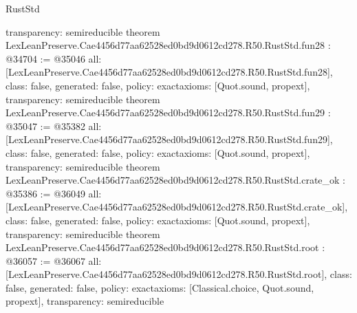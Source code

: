 \begin{lexlean}{RustStd}
\begin{coremodule}
{  transparency: semireducible
}
theorem LexLeanPreserve.Cae4456d77aa62528ed0bd9d0612cd278.R50.RustStd.fun28 : @34704 := @35046 {
  all: [LexLeanPreserve.Cae4456d77aa62528ed0bd9d0612cd278.R50.RustStd.fun28],
  class: false,
  generated: false,
  policy: exact{axioms: [Quot.sound, propext]},
  transparency: semireducible
}
theorem LexLeanPreserve.Cae4456d77aa62528ed0bd9d0612cd278.R50.RustStd.fun29 : @35047 := @35382 {
  all: [LexLeanPreserve.Cae4456d77aa62528ed0bd9d0612cd278.R50.RustStd.fun29],
  class: false,
  generated: false,
  policy: exact{axioms: [Quot.sound, propext]},
  transparency: semireducible
}
theorem LexLeanPreserve.Cae4456d77aa62528ed0bd9d0612cd278.R50.RustStd.crate_ok : @35386 := @36049 {
  all: [LexLeanPreserve.Cae4456d77aa62528ed0bd9d0612cd278.R50.RustStd.crate_ok],
  class: false,
  generated: false,
  policy: exact{axioms: [Quot.sound, propext]},
  transparency: semireducible
}
theorem LexLeanPreserve.Cae4456d77aa62528ed0bd9d0612cd278.R50.RustStd.root : @36057 := @36067 {
  all: [LexLeanPreserve.Cae4456d77aa62528ed0bd9d0612cd278.R50.RustStd.root],
  class: false,
  generated: false,
  policy: exact{axioms: [Classical.choice, Quot.sound, propext]},
  transparency: semireducible
}


\end{coremodule}
\end{lexlean}
